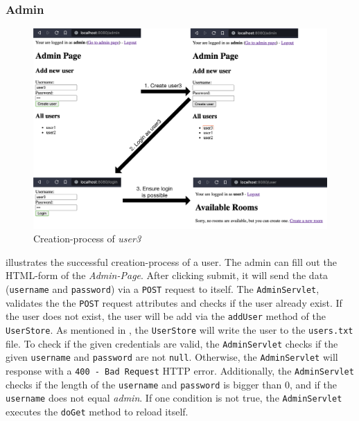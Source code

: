 \subsubsection{Admin}\label{subsubsec:03_impl_servlets_admin}
\begin{figure}[h]
\centering
\includegraphics[scale=0.2]{images/03_impl/admin/create_user_all}
\caption{Creation-process of \textit{user3}}
\label{fig:03_impl_servlets_room_createall}
\end{figure}
 illustrates the successful creation-process of a user.
The admin can fill out the HTML-form of the \textit{Admin-Page}. After clicking submit, it will send the data (\texttt{username} and \texttt{password}) via a \texttt{POST} request to itself.
The \texttt{AdminServlet}, validates the the \texttt{POST} request attributes and checks if the user already exist. If the user does not exist, the user will be add via the \texttt{addUser} method of the \texttt{UserStore}. As mentioned in , the \texttt{UserStore} will write the user to the \texttt{users.txt} file.
To check if the given credentials are valid, the \texttt{AdminServlet} checks if the given \texttt{username} and \texttt{password} are not \texttt{null}. Otherwise, the \texttt{AdminServlet} will response with a \texttt{400 - Bad Request} HTTP error. Additionally, the \texttt{AdminServlet} checks if the length of the \texttt{username} and \texttt{password} is bigger than 0, and if the \texttt{username} does not equal \textit{admin}. If one condition is not true, the \texttt{AdminServlet} executes the \texttt{doGet} method to reload itself.


